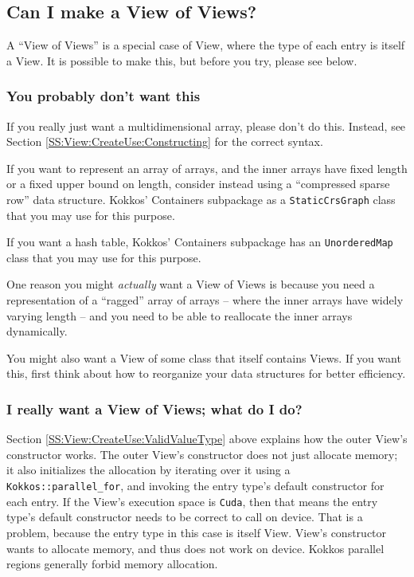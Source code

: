 \subsection{Can I make a View of Views?}
\label{SS:View:CreateUse:ViewOfViews}

A ``View of Views'' is a special case of View, where the type of each
entry is itself a View.  It is possible to make this, but before you
try, please see below.

\subsubsection{You probably don't want this}

If you really just want a multidimensional array, please don't do
this.  Instead, see Section \ref{SS:View:CreateUse:Constructing} for
the correct syntax.

If you want to represent an array of arrays, and the inner arrays have
fixed length or a fixed upper bound on length, consider instead using
a ``compressed sparse row'' data structure.  Kokkos' Containers
subpackage as a \lstinline|StaticCrsGraph| class that you may use for
this purpose.

If you want a hash table, Kokkos' Containers subpackage has an
\lstinline|UnorderedMap| class that you may use for this purpose.

One reason you might \emph{actually} want a View of Views is because
you need a representation of a ``ragged'' array of arrays -- where the
inner arrays have widely varying length -- and you need to be able to
reallocate the inner arrays dynamically.

You might also want a View of some class that itself contains Views.
If you want this, first think about how to reorganize your data
structures for better efficiency.

\subsubsection{I really want a View of Views; what do I do?}

Section \ref{SS:View:CreateUse:ValidValueType} above explains how the
outer View's constructor works.  The outer View's constructor does not
just allocate memory; it also initializes the allocation by iterating
over it using a \lstinline|Kokkos::parallel_for|, and invoking the
entry type's default constructor for each entry.  If the View's
execution space is \lstinline|Cuda|, then that means the entry type's
default constructor needs to be correct to call on device.  That is a
problem, because the entry type in this case is itself View.  View's
constructor wants to allocate memory, and thus does not work on
device.  Kokkos parallel regions generally forbid memory allocation.

